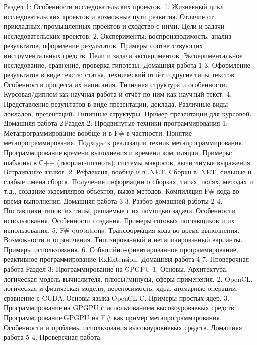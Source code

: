 Раздел 1: Особенности исследовательских проектов.
    1. Жизненный цикл исследовательских проектов и возможные пути развития. Отличие от прикладных/промышленных проектов и сходство с ними. Цели и задачи исследовательских проектов. 
    2. Эксперименты: воспроизводимость, анализ результатов, оформление результатов. Примеры соответствующих инструментальных средств. Цели и задачи экспериментов. Экспериментальное исследование, сравнение, проверка гипотезы.
Домашняя работа 1
    3. Оформление результатов в виде текста: статья, технический отчёт и другие типы текстов. Особенности процесса их написания. Типичная структура и особенности. Курсовая/диплом как научная работа и отчёт по ним как научный текст.
    4. Представление результатов в виде презентации, доклада. Различные виды докладов, презентаций. Типичные структуры. Пример презентации для курсовой.
Домашняя работа 2
Раздел 2: Продвинутые техники программирования 
    1. Метапрограммирование вообще и в F# в частности. Понятие метапрограммирования. Подходы к реализации техник метапрограммирования.  Программирование времени выполнения и времени компиляции. Примеры: шаблоны в С++ (тьюринг-полнота), системы макросов, вычислимые выражения. Встраивание языков.
    2. Рефлексия, вообще и в .NET. Сборки в .NET, сильные и слабые имена сборок. Получение информации о сборках, типах, полях, методах и т.д., создание экземпляров объектов, вызов методов. Компиляция F#-кода во время выполнения.
Домашняя работа 3
    3. Разбор домашней работы 2   
    4. Поставщики типов: их типы, решаемые с их помощью задачи. Особенности использования. Особенности создания. Примеры готовых поставщиков и их использования.
    5. F# quotations. Трансформация кода во время выполнения. Возможности и ограничения. Типизированный и нетипизированный варианты. Примеры использования.
    6. Событийно-ориентированное программирование, реактивное программирование RxExtension.
Домашняя работа 4
    7. Проверочная работа
Раздел 3: Программирование на GPGPU
    1. Основы. Архитектура, логическая модель вычислителя, плюсы/минусы, сферы применения.
    2. OpenCL, логическая и физическая модели, переносимость, ядра, атомарные операции, сравнение с CUDA. Основы языка OpenCL C. Примеры простых ядер.
    3. Программирование на GPGPU с использованием высокоуровневых средств. Программирование GPGPU на F# как пример метапрограммирования. Особенности и проблемы использования высокоуровневых средств.
Домашняя работа 5
    4. Проверочная работа.

